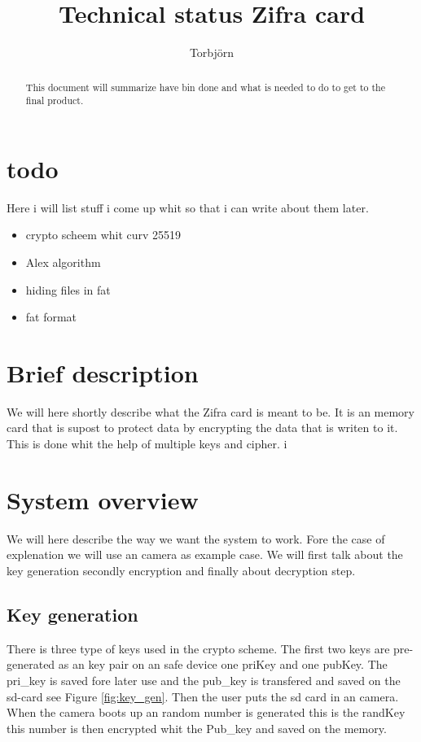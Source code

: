 \documentclass[]{article}
\title{Technical status Zifra card}
\author{Torbjörn}
\begin{document}
\maketitle
\tableofcontents
\newpage
\newpage

\begin{abstract}
This document will summarize have bin done and what is needed to do to get to the final product.
\end{abstract}

\newpage


\section{todo}
Here i will list stuff i come up whit so that i can write about them later.

\begin{itemize}
	\item crypto scheem whit curv 25519
	\item Alex algorithm
	\item hiding files in fat
	\item fat format
\end{itemize}

\section{Brief description}
We will here shortly describe what the Zifra card is meant to be.
It is an memory card that is supost to protect data by encrypting the data that is writen to it.
This is done whit the help of multiple \gls{keys} and \gls{cipher}.
i
\section{System overview}
We will here describe the way we want the system to work.
Fore the case of explenation we will use an camera as example case.
We will first talk about the key generation secondly encryption and finally about decryption step.

\subsection{Key generation}
There is three type of keys used in the crypto scheme.
The first two keys are pre-generated as an key pair on an safe device one \acrfull{priKey} and one \acrfull{pubKey}. 
The pri\_key is saved fore later use and the pub\_key is transfered and saved on the sd-card see Figure \ref{fig:key_gen}.
Then the user puts the sd card in an camera.
When the camera boots up an random number is generated this is the \acrfull{randKey} this number is then encrypted whit the Pub\_key and saved on the memory.
\end{document}

